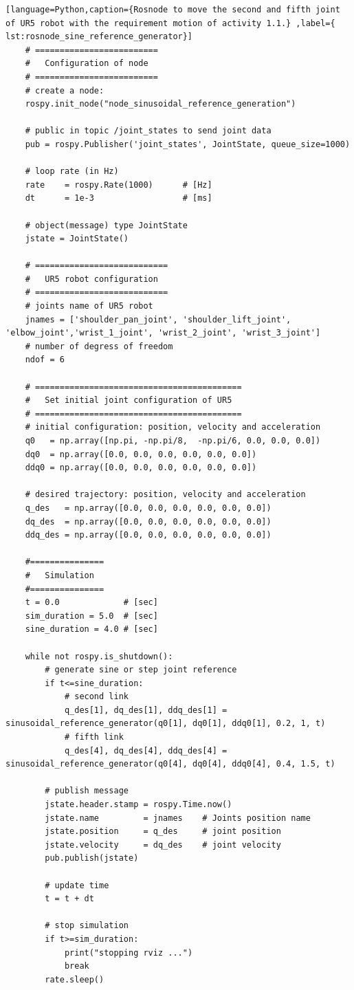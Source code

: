 \begin{lstlisting}[language=Python,caption={Rosnode to move the second and fifth joint of UR5 robot with the requirement motion of activity 1.1.} ,label={ lst:rosnode_sine_reference_generator}]
    # =========================
    #   Configuration of node
    # =========================
    # create a node: 
    rospy.init_node("node_sinusoidal_reference_generation")
    
    # public in topic /joint_states	to send joint data	
    pub = rospy.Publisher('joint_states', JointState, queue_size=1000)
    
    # loop rate (in Hz)
    rate 	= rospy.Rate(1000)		# [Hz]
    dt 		= 1e-3					# [ms]
    
    # object(message) type JointState
    jstate = JointState()
    
    # ===========================
    #   UR5 robot configuration
    # ===========================
    # joints name of UR5 robot
    jnames = ['shoulder_pan_joint', 'shoulder_lift_joint', 'elbow_joint','wrist_1_joint', 'wrist_2_joint', 'wrist_3_joint']
    # number of degress of freedom
    ndof = 6
    
    # ==========================================
    #   Set initial joint configuration of UR5
    # ==========================================
    # initial configuration: position, velocity and acceleration 
    q0   = np.array([np.pi, -np.pi/8,  -np.pi/6, 0.0, 0.0, 0.0])
    dq0  = np.array([0.0, 0.0, 0.0, 0.0, 0.0, 0.0])
    ddq0 = np.array([0.0, 0.0, 0.0, 0.0, 0.0, 0.0]) 
    
    # desired trajectory: position, velocity and acceleration
    q_des   = np.array([0.0, 0.0, 0.0, 0.0, 0.0, 0.0]) 
    dq_des  = np.array([0.0, 0.0, 0.0, 0.0, 0.0, 0.0]) 
    ddq_des = np.array([0.0, 0.0, 0.0, 0.0, 0.0, 0.0]) 
    
    #===============
    #   Simulation
    #===============
    t = 0.0             # [sec] 
    sim_duration = 5.0  # [sec]
    sine_duration = 4.0 # [sec]
    
    while not rospy.is_shutdown():
        # generate sine or step joint reference
        if t<=sine_duration:
            # second link
            q_des[1], dq_des[1], ddq_des[1] = sinusoidal_reference_generator(q0[1], dq0[1], ddq0[1], 0.2, 1, t)
            # fifth link
            q_des[4], dq_des[4], ddq_des[4] = sinusoidal_reference_generator(q0[4], dq0[4], ddq0[4], 0.4, 1.5, t)
    
        # publish message
        jstate.header.stamp = rospy.Time.now()
        jstate.name 		= jnames    # Joints position name
        jstate.position 	= q_des     # joint position
        jstate.velocity 	= dq_des    # joint velocity
        pub.publish(jstate)
    
        # update time
        t = t + dt

        # stop simulation
        if t>=sim_duration:
            print("stopping rviz ...")
            break  
        rate.sleep()
\end{lstlisting}


